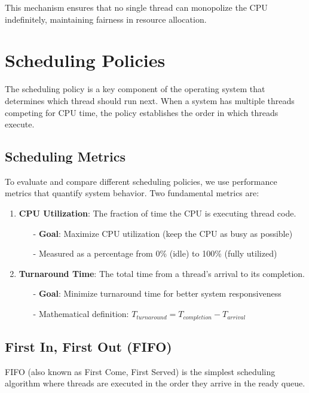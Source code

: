 \documentclass[../../compsys.tex]{subfiles}
\begin{document}
This mechanism ensures that no single thread can monopolize the CPU indefinitely, maintaining fairness in resource allocation.

\newpage
\section{Scheduling Policies}
The scheduling policy is a key component of the operating system that determines which thread should run next. When a system has multiple threads competing for CPU time, the policy establishes the order in which threads execute.

\subsection{Scheduling Metrics}
To evaluate and compare different scheduling policies, we use performance metrics that quantify system behavior. Two fundamental metrics are:

\begin{enumerate}
    \item \textbf{CPU Utilization}: The fraction of time the CPU is executing thread code.
    \begin{itemize}
        \item[-] \textbf{Goal}: Maximize CPU utilization (keep the CPU as busy as possible)
        \item[-] Measured as a percentage from 0\% (idle) to 100\% (fully utilized)
    \end{itemize}
    
    \item \textbf{Turnaround Time}: The total time from a thread's arrival to its completion.
    \begin{itemize}
        \item[-] \textbf{Goal}: Minimize turnaround time for better system responsiveness
        \item[-] Mathematical definition: $T_{turn around} = T_{completion} - T_{arrival}$
    \end{itemize}
\end{enumerate}

\subsection{First In, First Out (FIFO)}
FIFO (also known as First Come, First Served) is the simplest scheduling algorithm where threads are executed in the order they arrive in the ready queue.
\end{document}
